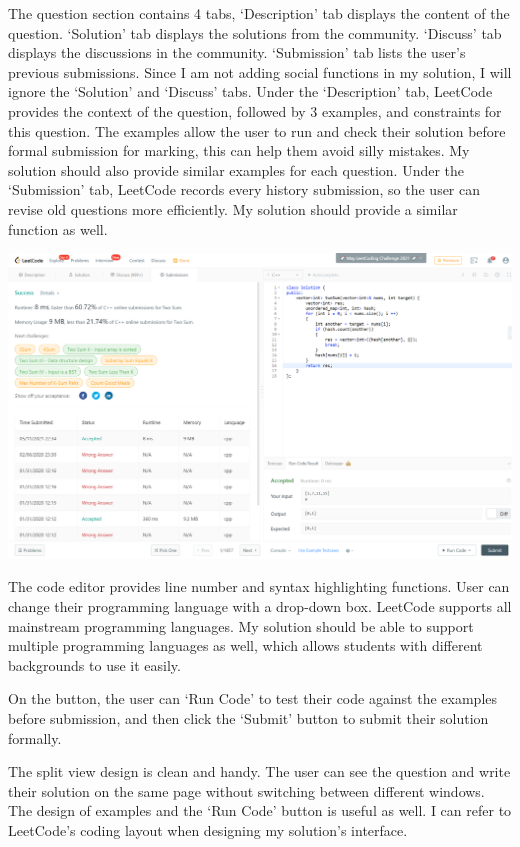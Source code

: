 \documentclass[a4paper]{report}
\begin{document}
The question section contains 4 tabs, `Description' tab displays the content of the question. `Solution' tab displays the solutions from the community. `Discuss' tab displays the discussions in the community. `Submission' tab lists the user's previous submissions. Since I am not adding social functions in my solution, I will ignore the `Solution' and `Discuss' tabs. Under the `Description' tab, LeetCode provides the context of the question, followed by 3 examples, and constraints for this question. The examples allow the user to run and check their solution before formal submission for marking, this can help them avoid silly mistakes. My solution should also provide similar examples for each question. Under the `Submission' tab, LeetCode records every history submission, so the user can revise old questions more efficiently. My solution should provide a similar function as well.

\includegraphics[width=\linewidth]{Two-Sum-LeetCode-Submission}

The code editor provides line number and syntax highlighting functions. User can change their programming language with a drop-down box. LeetCode supports all mainstream programming languages. My solution should be able to support multiple programming languages as well, which allows students with different backgrounds to use it easily.

On the button, the user can `Run Code' to test their code against the examples before submission, and then click the `Submit' button to submit their solution formally.

The split view design is clean and handy. The user can see the question and write their solution on the same page without switching between different windows. The design of examples and the `Run Code' button is useful as well. I can refer to LeetCode's coding layout when designing my solution's interface.
\end{document}
